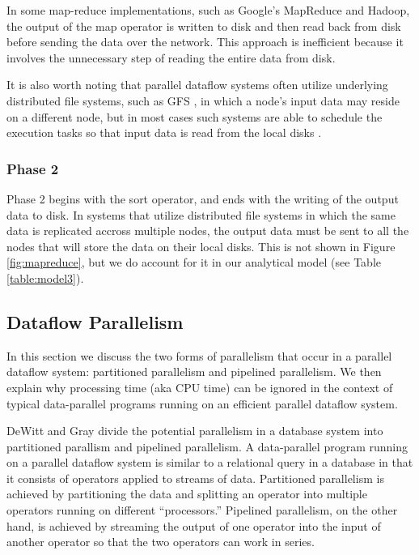 \documentclass{acm_proc_article-sp}
\begin{document}
In some map-reduce implementations, such as Google's MapReduce and Hadoop, the
output of the map operator is written to disk and then read back from disk
before sending the data over the network. This approach is inefficient because
it involves the unnecessary step of reading the entire data from disk.

It is also worth noting that parallel dataflow systems often
utilize underlying distributed file systems, such as GFS \cite{gfs}, in which a node's input data
may reside on a different node, but in most cases such systems are able to
schedule the execution tasks so that input data is read from the local disks
\cite{mapreduce}.

\subsubsection{Phase 2}

Phase 2 begins with the sort operator, and ends with the writing of the output
data to disk. In systems that utilize distributed file systems in which the
same data is replicated accross multiple nodes, the output data must be sent to
all the nodes that will store the data on their local disks. This is not shown
in Figure \ref{fig:mapreduce}, but we do account for it in our analytical
model (see Table \ref{table:model3}).

\subsection{Dataflow Parallelism}

In this section we discuss the two forms of parallelism that occur in a
parallel dataflow system: partitioned parallelism and pipelined parallelism. We
then explain why processing time (aka CPU time) can be ignored in the context
of typical data-parallel programs running on an efficient parallel dataflow
system.

DeWitt and Gray \cite{paralleldatabases} divide the potential parallelism in a
database system into partitioned parallism and pipelined parallelism. A
data-parallel program running on a parallel dataflow system is similar to a
relational query in a database in that it consists of operators applied to
streams of data. Partitioned parallelism is achieved by partitioning the data
and splitting an operator into multiple operators running on different
``processors.'' Pipelined parallelism, on the other hand, is achieved by
streaming the output of one operator into the input of another operator so that
the two operators can work in series.
\end{document}
